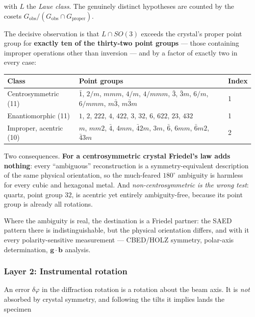 with $L$ the \emph{Laue class}. The genuinely distinct hypotheses are counted by the cosets
$G_{\text{obs}} / (G_{\text{obs}} \cap G_{\text{proper}})$.

The decisive observation is that $L \cap SO(3)$ exceeds the crystal's proper point group for
\textbf{exactly ten of the thirty-two point groups} --- those containing improper operations other
than inversion --- and by a factor of exactly two in every case:

\begin{center}
\begin{tabular}{lll}
\hline
Class & Point groups & Index \\
\hline
Centrosymmetric (11) & $\bar{1}$, $2/m$, $mmm$, $4/m$, $4/mmm$, $\bar{3}$, $\bar{3}m$, $6/m$, $6/mmm$, $m\bar{3}$, $m\bar{3}m$ & 1 \\
Enantiomorphic (11) & $1$, $2$, $222$, $4$, $422$, $3$, $32$, $6$, $622$, $23$, $432$ & 1 \\
Improper, acentric (10) & $m$, $mm2$, $\bar{4}$, $4mm$, $\bar{4}2m$, $3m$, $\bar{6}$, $6mm$, $\bar{6}m2$, $\bar{4}3m$ & 2 \\
\hline
\end{tabular}
\end{center}

Two consequences. \textbf{For a centrosymmetric crystal Friedel's law adds nothing}: every
``ambiguous'' reconstruction is a symmetry-equivalent description of the same physical orientation,
so the much-feared $180^{\circ}$ ambiguity is harmless for every cubic and hexagonal metal. And
\emph{non-centrosymmetric is the wrong test}: quartz, point group $32$, is acentric yet entirely
ambiguity-free, because its point group is already all rotations.

Where the ambiguity is real, the destination is a Friedel partner: the SAED pattern there is
indistinguishable, but the physical orientation differs, and with it every polarity-sensitive
measurement --- CBED/HOLZ symmetry, polar-axis determination, $\mathbf{g}\cdot\mathbf{b}$ analysis.

\subsubsection{Layer 2: Instrumental rotation}

An error $\delta\varphi$ in the diffraction rotation is a rotation about the beam axis. It is
\emph{not} absorbed by crystal symmetry, and following the tilts it implies lands the specimen

